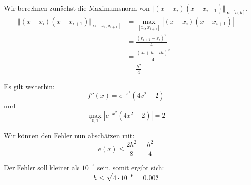 \documentclass[11pt]{article}
\theoremstyle{plain}
\theoremstyle{definition}
\renewcommand{\a}{\"{a}}
\renewcommand{\o}{\"{o}}
\begin{document}
Wir berechnen zun\a chst die Maximumsnorm von $\Vert(x-x_i)(x-x_{i+1})\Vert_{\infty, [a,b]}$.
\begin{align}
\Vert(x-x_i)(x-x_{i+1})\Vert_{\infty, [x_i,x_{i+1}]} &= \max_{[x_i,x_{i+1}]} |(x-x_i)(x-x_{i+1})| \\
&= \frac{(x_{i+1}-x_i)^2}{4}\\
&= \frac{(ih+h-ih)^2}{4} \\ 
&= \frac{h^2}{4}
\end{align}

Es gilt weiterhin:
\begin{equation}
f''(x) = e^{-x^2}(4x^2-2)
\end{equation}
und
\begin{equation}
\max_{[0,1]} |e^{-x^2}(4x^2-2)| = 2
\end{equation}

Wir k\o nnen den Fehler nun absch\a tzen mit:
\begin{equation}
e(x) \leq \frac{2h^2}{8} = \frac{h^2}{4}
\end{equation}

Der Fehler soll kleiner als $10^{-6}$ sein, somit ergibt sich:
\begin{equation}
h \leq \sqrt{4\cdot 10^{-6}} = 0.002
\end{equation}
\end{document}
